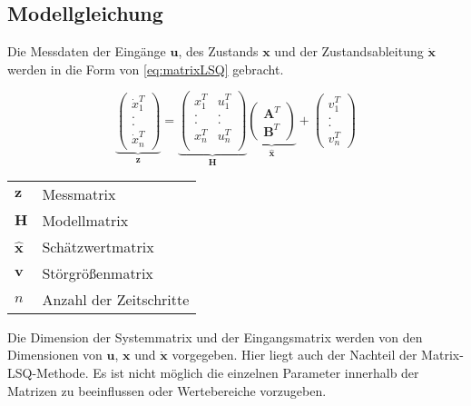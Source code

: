 \subsection{Modellgleichung}

Die Messdaten der Eingänge $\mathbf{u}$, des Zustands  $\mathbf{x}$ und der Zustandsableitung $\dot{\mathbf{x}}$ werden in 
die Form von \cref{eq:matrixLSQ} gebracht. 

\begin{equation}
    \underbrace{\begin{pmatrix}
        \dot{x}_1^T \\
        . \\
        . \\
        \dot{x}_n^T 
    \end{pmatrix}}_{\mathbf{z}} =
    \underbrace{\begin{pmatrix}
        x_{1}^T& u_{1}^T \\
        . & .  \\
        . & .  \\
        x_{n}^T & u_{n}^T \\
    \end{pmatrix}}_{\mathbf{H}}
    \underbrace{\begin{pmatrix}
        \mathbf{A}^T \\
        \mathbf{B}^T
    \end{pmatrix}}_{\hat{\mathbf{x}}} +
    \begin{pmatrix}
        v_1^T \\
        . \\
        . \\
        v_n^T
    \end{pmatrix}
	\label{eq:matrixLSQ}
\end{equation}

\begin{tabular}[\textwidth]{l l}

$\mathbf{z}$ & Messmatrix \\
$\mathbf{H}$ & Modellmatrix \\
$\hat{\mathbf{x}}$ & Schätzwertmatrix \\
$\mathbf{v}$ & Störgrößenmatrix \\
$n$ & Anzahl der Zeitschritte \\
\end{tabular}

Die Dimension der Systemmatrix und der Eingangsmatrix werden von den Dimensionen von $\mathbf{u}$,  $\mathbf{x}$ und 
$\dot{\mathbf{x}}$ vorgegeben. Hier liegt auch der Nachteil der Matrix-LSQ-Methode. Es ist nicht möglich die einzelnen 
Parameter innerhalb der Matrizen zu beeinflussen oder Wertebereiche vorzugeben.



